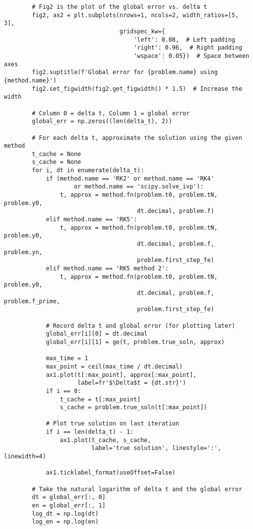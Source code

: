 \documentclass{article}
\begin{document}
\begin{verbatim}
        # Fig2 is the plot of the global error vs. delta t
        fig2, ax2 = plt.subplots(nrows=1, ncols=2, width_ratios=[5, 3],
                                 gridspec_kw={
                                     'left': 0.08,  # Left padding
                                     'right': 0.96,  # Right padding
                                     'wspace': 0.05})  # Space between axes
        fig2.suptitle(f'Global error for {problem.name} using {method.name}')
        fig2.set_figwidth(fig2.get_figwidth() * 1.5)  # Increase the width

        # Column 0 = delta t, Column 1 = global error
        global_err = np.zeros((len(delta_t), 2))

        # For each delta t, approximate the solution using the given method
        t_cache = None
        s_cache = None
        for i, dt in enumerate(delta_t):
            if (method.name == 'RK2' or method.name == 'RK4'
                    or method.name == 'scipy.solve_ivp'):
                t, approx = method.fn(problem.t0, problem.tN, problem.y0,
                                      dt.decimal, problem.f)
            elif method.name == 'RK5':
                t, approx = method.fn(problem.t0, problem.tN, problem.y0,
                                      dt.decimal, problem.f, problem.yn,
                                      problem.first_step_fe)
            elif method.name == 'RK5 method 2':
                t, approx = method.fn(problem.t0, problem.tN, problem.y0,
                                      dt.decimal, problem.f, problem.f_prime,
                                      problem.first_step_fe)

            # Record delta t and global error (for plotting later)
            global_err[i][0] = dt.decimal
            global_err[i][1] = ge(t, problem.true_soln, approx)

            max_time = 1
            max_point = ceil(max_time / dt.decimal)
            ax1.plot(t[:max_point], approx[:max_point],
                     label=fr'$\Delta$t = {dt.str}')
            if i == 0:
                t_cache = t[:max_point]
                s_cache = problem.true_soln(t[:max_point])

            # Plot true solution on last iteration
            if i == len(delta_t) - 1:
                ax1.plot(t_cache, s_cache,
                         label='true solution', linestyle=':', linewidth=4)

            ax1.ticklabel_format(useOffset=False)

        # Take the natural logarithm of delta t and the global error
        dt = global_err[:, 0]
        en = global_err[:, 1]
        log_dt = np.log(dt)
        log_en = np.log(en)


\end{verbatim}
\end{document}
